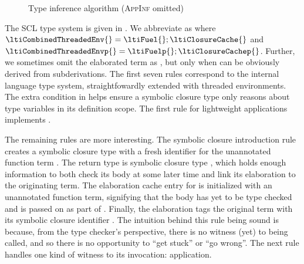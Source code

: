 \begin{figure}
  \caption{Type inference algorithm (\textsc{AppInf} omitted)
  }
  \label{symbolic:figure:SC-language-algorithmic-type-system}
\end{figure}

The SCL type system is given in .
We abbreviate
    \ltitSstkjudgement{\ltimakeCombinedThreadedEnv{\ltiFuel{}}{\ltiClosureCache{}}}
                      {\ltiEnv{}}
                      {\ltiE{}}
                      {\ltiT{}}
                      {\ltimakeCombinedThreadedEnv{\ltiFuelp{}}{\ltiClosureCachep{}}}
                      {\ltiEp{}}
                      as
    \ltitSstkjudgement{\ltiCombinedThreadedEnv{}}
                      {\ltiEnv{}}
                      {\ltiE{}}
                      {\ltiT{}}
                      {\ltiCombinedThreadedEnvp{}}
                      {\ltiEp{}}
                      where
${\ltiCombinedThreadedEnv{}} = {\ltimakeCombinedThreadedEnv{\ltiFuel{}}{\ltiClosureCache{}}}$
and 
                      ${\ltiCombinedThreadedEnvp{}} = {\ltimakeCombinedThreadedEnv{\ltiFuelp{}}{\ltiClosureCachep{}}}$.
Further, we sometimes omit the elaborated term as
    \ltitSstkjudgementNoElab{\ltiCombinedThreadedEnv{}}
                      {\ltiEnv{}}
                      {\ltiE{}}
                      {\ltiT{}}
                      {\ltiCombinedThreadedEnvp{}}
                      {\ltiEp{}},
                      but only when
                      {\ltiEp{}}
                      can be obviously derived from subderivations.
The first seven rules correspond to the internal language type system,
straightfowardly extended with threaded environments.
The extra condition in \ltiSCAbs
helps ensure a symbolic closure type only reasons about type variables
in its definition scope.
The first rule for lightweight applications \ltiSCAppInfBot implements \ltiEAppInfBot.

The remaining rules are more interesting.
The symbolic closure introduction rule
\ltiSCUAbs creates a symbolic closure type with a fresh identifier \ltiClosureID{}
for the unannotated function term \ltiufun{\ltivar{}}{\ltiE{}}.
The return type is symbolic closure type
                       \ltiClosureWithStkID{\ltiEnv{}}
                                           {\ltiClosureID{}}
                                           {\ltiufun{\ltivar{}}{\ltiE{}}},
which holds enough information to both check its body at some later time
and link its elaboration to the originating term.
The elaboration cache entry for \ltiClosureID{} is initialized 
with an unannotated function term, signifying that the body has yet to be type checked
and is passed on as part of \ltiCombinedThreadedEnvp{}.
Finally, the elaboration
                      {\ltiufunelab{\ltiClosureID{}}
                                   {\ltivar{}}
                                   {\ltiE{}}}
tags the original term with its symbolic closure identifier \ltiClosureID{}.
The intuition behind this rule being sound is because, from the type checker's perspective,
there is no witness (yet) to \ltiufun{\ltivar{}}{\ltiE{}}
being called, and so there is no opportunity to ``get stuck'' or
``go wrong''. 
The next rule handles one kind of witness to its invocation: application.

